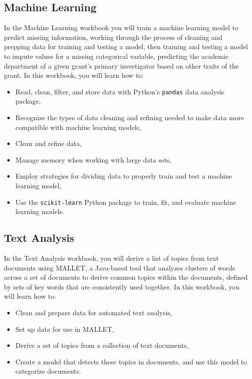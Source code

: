 \documentclass[]{krantz}
\begin{document}
\subsection{Machine Learning}\label{machine-learning}

In the Machine Learning workbook you will train a machine learning model
to predict missing information, working through the process of cleaning
and prepping data for training and testing a model, then training and
testing a model to impute values for a missing categorical variable,
predicting the academic department of a given grant's primary
investigator based on other traits of the grant. In this workbook, you
will learn how to:

\begin{itemize}
\item
  Read, clean, filter, and store data with Python's \texttt{pandas} data
  analysis package,
\item
  Recognize the types of data cleaning and refining needed to make data
  more compatible with machine learning models,
\item
  Clean and refine data,
\item
  Manage memory when working with large data sets,
\item
  Employ strategies for dividing data to properly train and test a
  machine learning model,
\item
  Use the \texttt{scikit-learn} Python package to train, fit, and
  evaluate machine learning models.
\end{itemize}

\subsection{Text Analysis}\label{text-analysis}

In the Text Analysis workbook, you will derive a list of topics from
text documents using MALLET, a Java-based tool that analyzes clusters of
words across a set of documents to derive common topics within the
documents, defined by sets of key words that are consistently used
together. In this workbook, you will learn how to:

\begin{itemize}
\item
  Clean and prepare data for automated text analysis,
\item
  Set up data for use in MALLET,
\item
  Derive a set of topics from a collection of text documents,
\item
  Create a model that detects these topics in documents, and use this
  model to categorize documents.
\end{itemize}
\end{document}
